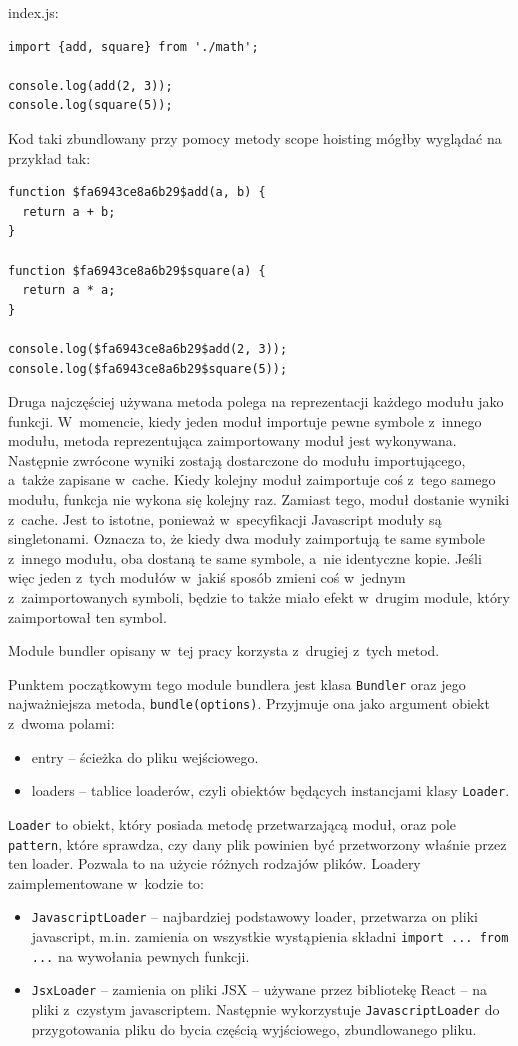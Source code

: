 \documentclass{SGGW-thesis}
\begin{document}
index.js:
\begin{verbatim}
import {add, square} from './math';

console.log(add(2, 3));
console.log(square(5));
\end{verbatim}

Kod taki zbundlowany przy pomocy metody scope hoisting mógłby wyglądać na przykład tak:

\begin{verbatim}
function $fa6943ce8a6b29$add(a, b) {
  return a + b;
}

function $fa6943ce8a6b29$square(a) {
  return a * a;
}

console.log($fa6943ce8a6b29$add(2, 3));
console.log($fa6943ce8a6b29$square(5));
\end{verbatim}

Druga najczęściej używana metoda polega na reprezentacji każdego modułu jako funkcji. W~momencie, kiedy jeden moduł importuje pewne symbole z~innego modułu, metoda reprezentująca zaimportowany moduł jest wykonywana. Następnie zwrócone wyniki zostają dostarczone do modułu importującego, a~także zapisane w~cache. Kiedy kolejny moduł zaimportuje coś z~tego samego modułu, funkcja nie wykona się kolejny raz. Zamiast tego, moduł dostanie wyniki z~cache. Jest to istotne, ponieważ w~specyfikacji Javascript moduły są singletonami\cite{object_oriented_javascript}. Oznacza to, że kiedy dwa moduły zaimportują te same symbole z~innego modułu, oba dostaną te same symbole, a~nie identyczne kopie. Jeśli więc jeden z~tych modułów w~jakiś sposób zmieni coś w~jednym z~zaimportowanych symboli, będzie to także miało efekt w~drugim module, który zaimportował ten symbol.

Module bundler opisany w~tej pracy korzysta z~drugiej z~tych metod.

Punktem początkowym tego module bundlera jest klasa \verb|Bundler| oraz jego najważniejsza metoda, \verb|bundle(options)|. Przyjmuje ona jako argument obiekt z~dwoma polami: 
\begin{itemize}
    \item entry -- ścieżka do pliku wejściowego.
    \item loaders -- tablice loaderów, czyli obiektów będących instancjami klasy \verb|Loader|.
\end{itemize}

\verb|Loader| to obiekt, który posiada metodę przetwarzającą moduł, oraz pole \verb|pattern|, które sprawdza, czy dany plik powinien być przetworzony właśnie przez ten loader. Pozwala to na użycie różnych rodzajów plików. Loadery zaimplementowane w~kodzie to:
\begin{itemize}
    \item \verb|JavascriptLoader| -- najbardziej podstawowy loader, przetwarza on pliki javascript, m.in. zamienia on wszystkie wystąpienia składni \verb|import ... from ...| na wywołania pewnych funkcji.
    \item \verb|JsxLoader| -- zamienia on pliki JSX -- używane przez bibliotekę React -- na pliki z~czystym javascriptem. Następnie wykorzystuje \verb|JavascriptLoader| do przygotowania pliku do bycia częścią wyjściowego, zbundlowanego pliku.
\end{itemize}
\end{document}
